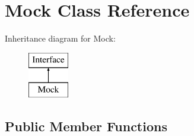 \hypertarget{classMock}{}\section{Mock Class Reference}
\label{classMock}
Inheritance diagram for Mock\+:\begin{figure}[H]
\begin{center}
\leavevmode
\includegraphics[height=2.000000cm]{classMock}
\end{center}
\end{figure}
\subsection*{Public Member Functions}

